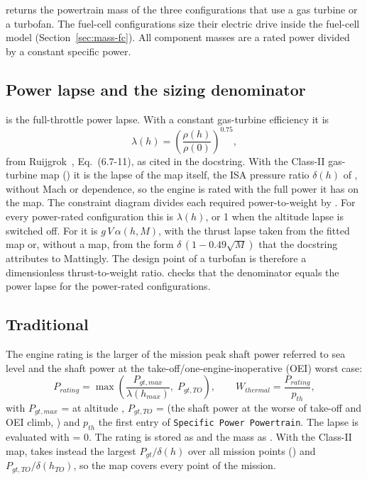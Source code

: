\documentclass[a4paper,11pt]{article}
\begin{document}
 returns the powertrain mass
 of the three configurations that use a gas turbine or a turbofan. The
fuel-cell configurations size their electric drive inside the fuel-cell model
(Section~\ref{sec:mass-fc}). All component masses are a rated power divided by a constant
specific power.

\subsection{Power lapse and the sizing denominator}\label{sec:lapse}
 is the full-throttle power lapse. With a
constant gas-turbine efficiency it is
\begin{equation}
  \lambda(h) = \left(\frac{\rho(h)}{\rho(0)}\right)^{0.75},
\end{equation}
from Ruijgrok~\cite{ruijgrok}, Eq.~(6.7-11), as cited in the docstring. With the Class-II
gas-turbine map () it is the lapse of the map itself, the ISA
pressure ratio $\delta(h)$ of , without Mach or
 dependence, so the engine is rated with the full power it has on the map. The
constraint diagram divides each required power-to-weight by
. For every power-rated configuration this is $\lambda(h)$, or 1 when the altitude
lapse is switched off. For  it is $g\,V\,\alpha(h, M)$, with the thrust
lapse  taken from the fitted map or, without a map, from the form
$\delta\,(1 - 0.49\sqrt{M})$ that the docstring attributes to Mattingly. The design point of
a turbofan is therefore a dimensionless thrust-to-weight ratio.
 checks that the denominator equals the
power lapse for the power-rated configurations.

\subsection{Traditional}
The engine rating is the larger of the mission peak shaft power referred to sea level and the
shaft power at the take-off/one-engine-inoperative (OEI) worst case:
\begin{equation}
  P_{rating} = \max\left(\frac{P_{gt,max}}{\lambda(h_{max})},\; P_{gt,TO}\right),\qquad
  W_{thermal} = \frac{P_{rating}}{p_{th}} ,
  \label{eq:rating}
\end{equation}
with $P_{gt,max}$ =  at altitude ,
$P_{gt,TO}$ =  (the shaft power at the worse of take-off and OEI climb,
) and $p_{th}$ the first entry of
\texttt{Specific Power Powertrain}. The lapse is evaluated with  = 0. The rating is
stored as  and the mass as . With the Class-II map,
 takes instead the largest $P_{gt}/\delta(h)$ over all mission
points () and $P_{gt,TO}/\delta(h_{TO})$, so the map covers every
point of the mission.
\end{document}

